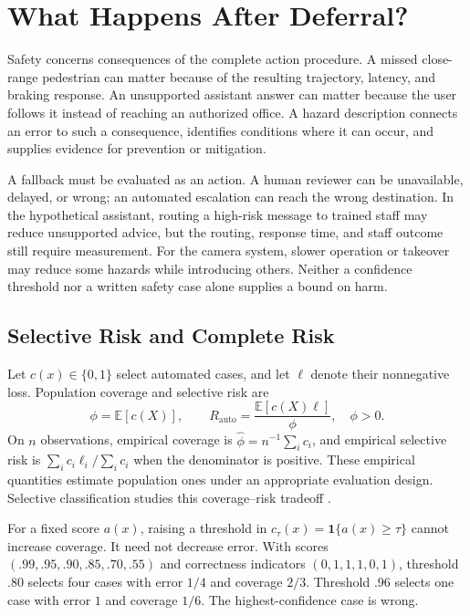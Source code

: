 \section{What Happens After Deferral?}

Safety concerns consequences of the complete action procedure. A missed close-range pedestrian can matter because of the resulting trajectory, latency, and braking response. An unsupported assistant answer can matter because the user follows it instead of reaching an authorized office. A hazard description connects an error to such a consequence, identifies conditions where it can occur, and supplies evidence for prevention or mitigation.

A fallback must be evaluated as an action. A human reviewer can be unavailable, delayed, or wrong; an automated escalation can reach the wrong destination. In the hypothetical assistant, routing a high-risk message to trained staff may reduce unsupported advice, but the routing, response time, and staff outcome still require measurement. For the camera system, slower operation or takeover may reduce some hazards while introducing others. Neither a confidence threshold nor a written safety case alone supplies a bound on harm.

\subsection{Selective Risk and Complete Risk}

Let $c(x)\in\{0,1\}$ select automated cases, and let $\ell$ denote their nonnegative loss. Population coverage and selective risk are
\[
\phi=\mathbb E[c(X)],\qquad
R_{\mathrm{auto}}=\frac{\mathbb E[c(X)\ell]}{\phi},\quad\phi>0.
\]
On $n$ observations, empirical coverage is $\hat\phi=n^{-1}\sum_i c_i$, and empirical selective risk is $\sum_i c_i\ell_i/\sum_i c_i$ when the denominator is positive. These empirical quantities estimate population ones under an appropriate evaluation design. Selective classification studies this coverage--risk tradeoff \citep{geifman2017}.

For a fixed score $a(x)$, raising a threshold in $c_\tau(x)=\mathbf1\{a(x)\ge\tau\}$ cannot increase coverage. It need not decrease error. With scores $(.99,.95,.90,.85,.70,.55)$ and correctness indicators $(0,1,1,1,0,1)$, threshold $.80$ selects four cases with error $1/4$ and coverage $2/3$. Threshold $.96$ selects one case with error $1$ and coverage $1/6$. The highest-confidence case is wrong.


